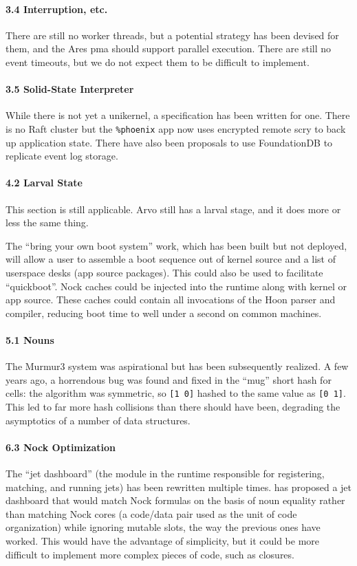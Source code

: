 \documentclass[twoside]{article}
\begin{document}
\paragraph{3.4 Interruption, etc.}  There are still no worker threads, but a potential strategy has been devised for them, and the Ares {\sc pma} should support parallel execution.  There are still no event timeouts, but we do not expect them to be difficult to implement.

\paragraph{3.5 Solid-State Interpreter}  While there is not yet a unikernel, a specification has been written for one.  There is no Raft cluster but the \lstinline[style=inlinecode]{%phoenix} app now uses encrypted remote scry to back up application state.  There have also been proposals to use FoundationDB to replicate event log storage.

\paragraph{4.2 Larval State}

This section is still applicable.  Arvo still has a larval stage, and it does more or less the same thing.

The ``bring your own boot system'' work, which has been built but not deployed, will allow a user to assemble a boot sequence out of kernel source and a list of userspace desks (app source packages).  This could also be used to facilitate ``quickboot''.  Nock caches could be injected into the runtime along with kernel or app source.  These caches could contain all invocations of the Hoon parser and compiler, reducing boot time to well under a second on common machines.

\paragraph{5.1 Nouns}  The Murmur3 system was aspirational but has been subsequently realized.  A few years ago, a horrendous bug was found and fixed in the ``mug'' short hash for cells:  the algorithm was symmetric, so \lstinline[style=inlinecode]{[1 0]} hashed to the same value as \lstinline[style=inlinecode]{[0 1]}.  This led to far more hash collisions than there should have been, degrading the asymptotics of a number of data structures.

\paragraph{6.3 Nock Optimization}  The ``jet dashboard'' (the module in the runtime responsible for registering, matching, and running jets) has been rewritten multiple times.   has proposed a jet dashboard that would match Nock formulas on the basis of noun equality rather than matching Nock cores (a code/data pair used as the unit of code organization) while ignoring mutable slots, the way the previous ones have worked.  This would have the advantage of simplicity, but it could be more difficult to implement more complex pieces of code, such as closures.
\end{document}
